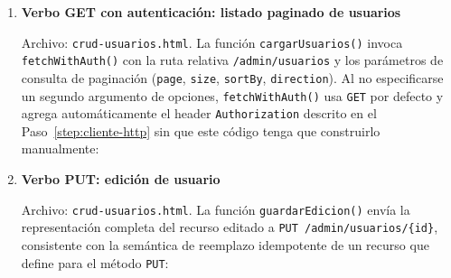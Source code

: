 \documentclass[12pt,a4paper]{article}
\begin{document}
\begin{enumerate}
    

    La respuesta se interpreta según el contrato del backend: si el campo \texttt{requiere2fa} viene en \texttt{true}, el flujo normal de login se detiene y se activa el formulario de verificación en dos pasos (ver Paso~\ref{step:2fa}) en lugar de tratarlo como un error:

    

    \item \textbf{Verbo GET con autenticación: listado paginado de usuarios}\label{step:get}

    Archivo: \texttt{crud-usuarios.html}. La función \texttt{cargarUsuarios()} invoca \texttt{fetchWithAuth()} con la ruta relativa \texttt{/admin/usuarios} y los parámetros de consulta de paginación (\texttt{page}, \texttt{size}, \texttt{sortBy}, \texttt{direction}). Al no especificarse un segundo argumento de opciones, \texttt{fetchWithAuth()} usa \texttt{GET} por defecto y agrega automáticamente el header \texttt{Authorization} descrito en el Paso~\ref{step:cliente-http} sin que este código tenga que construirlo manualmente:

    

    \item \textbf{Verbo PUT: edición de usuario}\label{step:put}

    \begin{sloppypar}
    Archivo: \texttt{crud-usuarios.html}. La función \texttt{guardarEdicion()} envía la representación completa del recurso editado a \texttt{PUT /admin/usuarios/\{id\}}, consistente con la semántica de reemplazo idempotente de un recurso que define \cite{rfc9110} para el método \texttt{PUT}:
    \end{sloppypar}

    


\end{enumerate}
\end{document}
